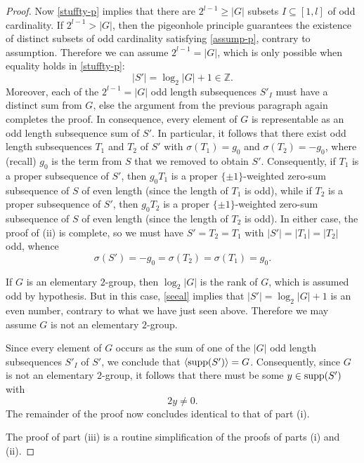 \documentclass[11pt,reqno]{amsart}
\numberwithin{equation}{section}
\theoremstyle{definition}
\numberwithin{equation}{section}
\begin{document}
\begin{proof}
Now \eqref{stuffty-p} implies that there are $2^{l-1}\geq |G|$ subsets
$I\subseteq [1,l]$ of odd cardinality. If $2^{l-1}>|G|$, then the pigeonhole
principle guarantees the existence of distinct subsets of odd cardinality
satisfying \eqref{assump-p}, contrary to assumption. Therefore we can
assume $2^{l-1}= |G|$, which is only possible when equality holds in
\eqref{stuffty-p}: \begin{equation}\label{seeal}|S'|= \log_2 |G|+1\in {\mathbb Z}.\end{equation} Moreover,
each of the $2^{l-1}=|G|$ odd length subsequences $S'_I$ must have a
 distinct sum from $G$, else the argument from the previous paragraph
again  completes the proof. In consequence, every element of $G$ is
representable as an odd length subsequence sum of $S'$. In particular,
it follows that there exist odd length subsequences $T_1$ and $T_2$ of $S'$
with $\sigma(T_1)=g_0$ and $\sigma(T_2)=-g_0$, where (recall) $g_0$ is the term from $S$ that we removed to obtain $S'$.
Consequently, if $T_1$ is a proper subsequence of $S'$, then $g_0T_1$ is a proper $\{\pm 1\}$-weighted
zero-sum subsequence of $S$ of even length
(since the length of $T_1$ is odd), while if $T_2$ is a proper subsequence of $S'$, then $g_0T_2$
is a proper $\{\pm 1\}$-weighted zero-sum
subsequence of $S$ of even length (since the length of $T_2$ is odd). In either case, the proof of (ii) is complete,
so we must have $S'=T_2=T_1$
with $|S'|=|T_1|=|T_2|$ odd, whence  \begin{equation}\label{one-p}\sigma(S')=-g_0=\sigma(T_2)=\sigma(T_1)=g_0.\end{equation}

If $G$ is an elementary $2$-group, then $\log_2 |G|$ is the rank of $G$, which is assumed odd by hypothesis.
But in this case, \eqref{seeal}
implies that  $|S'|=\log_2 |G|+1$ is an even number, contrary to what we have just seen above.
Therefore we may assume $G$ is not
an elementary $2$-group.

Since  every element of $G$ occurs as the sum of one of the $|G|$ odd length subsequences $S'_I$ of $S'$,
we conclude that ${\langle} {\text{\rm supp}}(S'){\rangle}=G$.
Consequently, since $G$ is not an elementary $2$-group, it follows that there must be some $y\in {\text{\rm supp}}(S')$
 with \begin{equation}\label{two-p}2y\neq 0.\end{equation}
The remainder of the proof now concludes identical to that of part (i).

\medskip

The proof of part (iii) is a routine simplification of the proofs of parts (i) and (ii).\qedsymbol
\end{proof}
\end{document}
